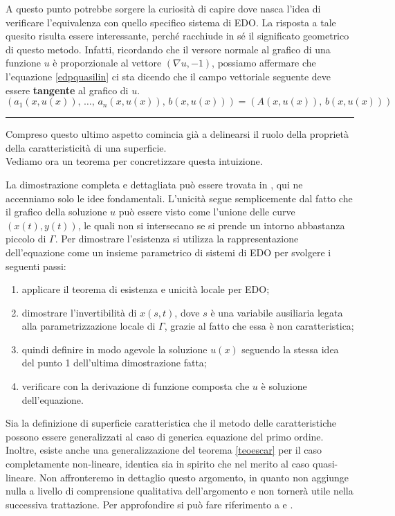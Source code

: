 A questo punto potrebbe sorgere la curiosità di capire dove nasca l'idea di verificare l'equivalenza con quello specifico sistema di EDO. La risposta a tale quesito risulta essere interessante, perché racchiude in sé il significato geometrico di questo metodo. Infatti, ricordando che il versore normale al grafico di una funzione $u$ è proporzionale al vettore $(\nabla u , -1)$, possiamo affermare che l'equazione \eqref{edpquasilin} ci sta dicendo che il campo vettoriale seguente deve essere  \textbf{tangente} al grafico di $u$.
$$(a_1(x,u(x)),\, \ldots ,\, a_n(x,u(x)),\, b(x,u(x)))=(A(x,u(x)),\, b(x,u(x)))$$

\noindent\rule[0.5ex]{\linewidth}{0.2pt}

Compreso questo ultimo aspetto comincia già a delinearsi il ruolo della proprietà della caratteristicità di una superficie. \\
Vediamo ora un teorema per concretizzare questa intuizione.
\begin{theorem}\label{teoescar}
\end{theorem}
La dimostrazione completa e dettagliata può essere trovata in \cite[cap.1]{Folland}, qui ne accenniamo solo le idee fondamentali. L'unicità segue semplicemente dal fatto che il grafico della soluzione $u$ può essere visto come l'unione delle curve $(x(t),y(t))$, le quali non si intersecano se si prende un intorno abbastanza piccolo di $\Gamma$. Per dimostrare l'esistenza si utilizza la rappresentazione dell'equazione come un insieme parametrico di sistemi di EDO per svolgere i seguenti passi:
\begin{enumerate}
\item applicare il teorema di esistenza e unicità locale per EDO;
\item dimostrare l'invertibilità di $x(s,t)$, dove $s$ è una variabile ausiliaria legata alla parametrizzazione locale di $\Gamma$, grazie al fatto che essa è non caratteristica;
\item quindi definire in modo agevole la soluzione $u(x)$ seguendo la stessa idea del punto 1 dell'ultima dimostrazione fatta;
\item verificare con la derivazione di funzione composta che $u$ è soluzione dell'equazione.
\end{enumerate}
Sia la definizione di superficie caratteristica che il metodo delle caratteristiche possono essere generalizzati al caso di generica equazione del primo ordine. Inoltre, esiste anche una generalizzazione del teorema \ref{teoescar} per il caso completamente non-lineare, identica sia in spirito che nel merito al caso quasi-lineare.
Non affronteremo in dettaglio questo argomento, in quanto non aggiunge nulla a livello di comprensione qualitativa dell'argomento e non tornerà utile nella successiva trattazione. Per approfondire si può fare riferimento a \cite[cap.1]{Folland} e \cite[cap.3]{Evans}.

